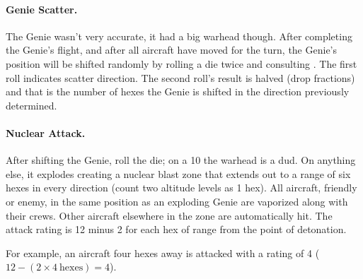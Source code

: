 \begin{advancedrules}
\paragraph{Genie Scatter.} The Genie wasn't very accurate, it had a big warhead though. After completing the Genie's flight, and after all aircraft have moved for the turn, the Genie’s position will be shifted randomly by rolling a die twice and consulting . The first roll indicates scatter direction. The second roll's result is halved (drop fractions) and that is the number of hexes the Genie is shifted in the direction previously determined. 

\paragraph{Nuclear Attack.} After shifting the Genie, roll the die; on a 10 the warhead is a dud. On anything else, it explodes creating a nuclear blast zone that extends out to a range of six hexes in every direction (count two altitude levels as 1 hex). All aircraft, friendly or enemy, in the same position as an exploding Genie are vaporized along with their crews. Other aircraft elsewhere in the zone are automatically hit. The attack rating is 12 minus 2 for each hex of range from the point of detonation.

For example, an aircraft four hexes away is attacked with a rating of 4 ($12 - (2 \times 4\ \mathrm{hexes}) = 4$).

\end{advancedrules}
